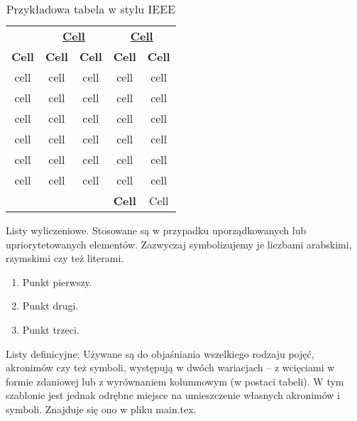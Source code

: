 \begin{table}[H] \centering
    \caption{Przykładowa tabela w stylu IEEE}
    \label{tab:IEEE}
    \begin{tabular}{c c c c c}
        \toprule[1pt]
         & \multicolumn{2}{c}{\textbf{\uline{\hspace{0.5cm} Cell \hspace{0.5cm}}}} & \multicolumn{2}{c}{\textbf{\uline{\hspace{0.5cm} Cell \hspace{0.5cm}}}}   \\
        \textbf{{Cell}}  &\textbf{{Cell}}     &  \textbf{Cell}&   \textbf{Cell} &  \textbf{Cell} \\  \midrule
        cell  & cell & cell & cell & cell   \\
        cell  & cell & cell & cell & cell   \\
        cell  & cell & cell & cell & cell   \\
        cell  & cell & cell & cell & cell   \\
        cell  & cell & cell & cell & cell   \\ 
        cell  & cell & cell & cell & cell   \\ \midrule
        \multicolumn{4}{r}{\textbf{Cell}} & Cell \\
        \bottomrule[1pt]
    \end{tabular}
\end{table}

\noindent Listy wyliczeniowe. Stosowane są w przypadku uporządkowanych lub upriorytetowanych elementów. Zazwyczaj symbolizujemy je liczbami arabskimi, rzymskimi czy też literami.
\begin{enumerate}
    \item Punkt pierwszy.
    \item Punkt drugi.
    \item Punkt trzeci.
\end{enumerate}
\noindent Listy definicyjne:
Używane są do objaśniania wszelkiego rodzaju pojęć,  akronimów czy też symboli, występują w dwóch
wariacjach -- z wcięciami w formie zdaniowej lub z wyrównaniem kolumnowym (w postaci tabeli).
W tym szablonie jest jednak odrębne miejsce na umieszczenie własnych akronimów i symboli. Znajduje
się ono w pliku main.tex.

